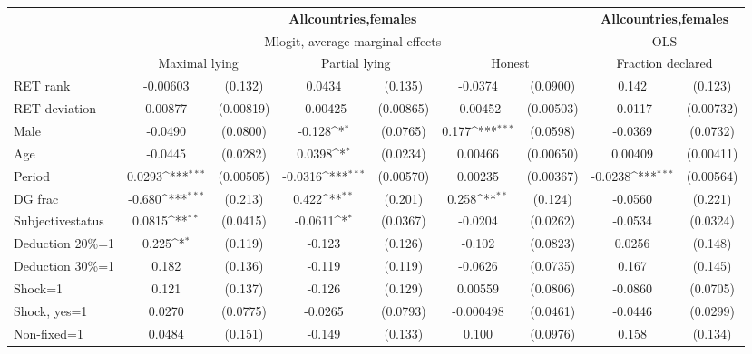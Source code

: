 \def\sym#1{\ifmmode^{#1}\else\(^{#1}\)\fi}
\begin{tabular}{l|cccccc|cc}
\hline\hline
&\multicolumn{6}{c|}{\bf All\space{}countries,\space{}females}&\multicolumn{2}{c}{\bf All\space{}countries,\space{}females}\\ &\multicolumn{6}{c|}{Mlogit, average marginal effects }&\multicolumn{2}{c}{OLS}\\
                &\multicolumn{2}{c}{Maximal lying}&\multicolumn{2}{c}{Partial lying}&\multicolumn{2}{c}{Honest}  &\multicolumn{2}{c}{Fraction declared}\\
\hline
RET rank        & -0.00603         &  (0.132)&   0.0434         &  (0.135)&  -0.0374         & (0.0900)&    0.142         &  (0.123)\\
RET deviation   &  0.00877         &(0.00819)& -0.00425         &(0.00865)& -0.00452         &(0.00503)&  -0.0117         &(0.00732)\\
Male            &  -0.0490         & (0.0800)&   -0.128\sym{*}  & (0.0765)&    0.177\sym{***}& (0.0598)&  -0.0369         & (0.0732)\\
Age             &  -0.0445         & (0.0282)&   0.0398\sym{*}  & (0.0234)&  0.00466         &(0.00650)&  0.00409         &(0.00411)\\
Period          &   0.0293\sym{***}&(0.00505)&  -0.0316\sym{***}&(0.00570)&  0.00235         &(0.00367)&  -0.0238\sym{***}&(0.00564)\\
DG frac         &   -0.680\sym{***}&  (0.213)&    0.422\sym{**} &  (0.201)&    0.258\sym{**} &  (0.124)&  -0.0560         &  (0.221)\\
Subjective\space{}status&   0.0815\sym{**} & (0.0415)&  -0.0611\sym{*}  & (0.0367)&  -0.0204         & (0.0262)&  -0.0534         & (0.0324)\\
Deduction 20\%=1&    0.225\sym{*}  &  (0.119)&   -0.123         &  (0.126)&   -0.102         & (0.0823)&   0.0256         &  (0.148)\\
Deduction 30\%=1&    0.182         &  (0.136)&   -0.119         &  (0.119)&  -0.0626         & (0.0735)&    0.167         &  (0.145)\\
Shock=1         &    0.121         &  (0.137)&   -0.126         &  (0.129)&  0.00559         & (0.0806)&  -0.0860         & (0.0705)\\
Shock, yes=1    &   0.0270         & (0.0775)&  -0.0265         & (0.0793)&-0.000498         & (0.0461)&  -0.0446         & (0.0299)\\
Non-fixed=1     &   0.0484         &  (0.151)&   -0.149         &  (0.133)&    0.100         & (0.0976)&    0.158         &  (0.134)\\

\end{tabular}
